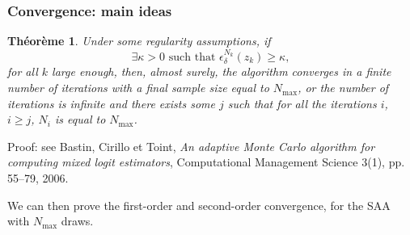 \documentclass{beamer}
\newtheorem{theo}{Théorème}
\begin{document}
\begin{frame}
\frametitle{Convergence: main ideas}

\begin{theo}
Under some regularity assumptions, if
\[
\exists \kappa > 0\text{ such that }
\epsilon_{\delta}^{N_k}(z_k) \geq \kappa,
\]
for all $k$ large enough, then, almost surely, the algorithm converges in a finite number of iterations with a final sample size equal to $N_{\max}$, or the number of iterations is infinite and there exists some $j$ such that for all the iterations $i$, $i \geq j$, $N_i$ is equal to $N_{\max}$.
\end{theo}
Proof: see Bastin, Cirillo et Toint, {\sl An adaptive {Monte Carlo}
  algorithm for computing mixed logit estimators}, Computational
Management Science 3(1), pp. 55--79, 2006.

\mbox{}

We can then prove the first-order and second-order convergence, for the SAA with $N_{\max}$ draws.

\end{frame}
\end{document}

